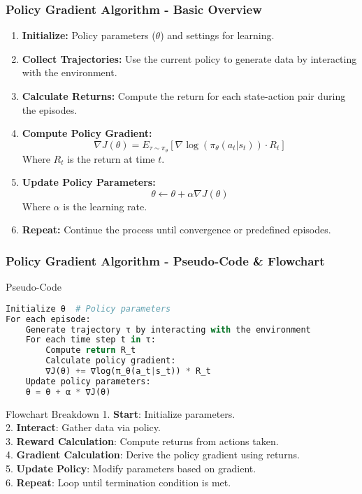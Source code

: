 \documentclass[aspectratio=169]{beamer}
\begin{document}
\begin{frame}[fragile]
    \frametitle{Policy Gradient Algorithm - Basic Overview}
    \begin{enumerate}
        \item \textbf{Initialize:} Policy parameters ($\theta$) and settings for learning.
        \item \textbf{Collect Trajectories:} Use the current policy to generate data by interacting with the environment.
        \item \textbf{Calculate Returns:} Compute the return for each state-action pair during the episodes.
        \item \textbf{Compute Policy Gradient:} 
        \begin{equation}
            \nabla J(\theta) = E_{\tau \sim \pi_{\theta}} \left[ \nabla \log(\pi_{\theta}(a_t|s_t)) \cdot R_t \right]
        \end{equation}
        Where $R_t$ is the return at time $t$.
        \item \textbf{Update Policy Parameters:} 
        \begin{equation}
            \theta \leftarrow \theta + \alpha \nabla J(\theta)
        \end{equation}
        Where $\alpha$ is the learning rate.
        \item \textbf{Repeat:} Continue the process until convergence or predefined episodes.
    \end{enumerate}
\end{frame}

\begin{frame}[fragile]
    \frametitle{Policy Gradient Algorithm - Pseudo-Code \& Flowchart}
    
    \begin{block}{Pseudo-Code}
        \begin{lstlisting}[language=Python]
Initialize θ  # Policy parameters
For each episode:
    Generate trajectory τ by interacting with the environment
    For each time step t in τ:
        Compute return R_t
        Calculate policy gradient:
        ∇J(θ) += ∇log(π_θ(a_t|s_t)) * R_t
    Update policy parameters:
    θ = θ + α * ∇J(θ)
        \end{lstlisting}
    \end{block}

    \begin{block}{Flowchart Breakdown}
        1. \textbf{Start}: Initialize parameters.\\
        2. \textbf{Interact}: Gather data via policy.\\
        3. \textbf{Reward Calculation}: Compute returns from actions taken.\\
        4. \textbf{Gradient Calculation}: Derive the policy gradient using returns.\\
        5. \textbf{Update Policy}: Modify parameters based on gradient.\\
        6. \textbf{Repeat}: Loop until termination condition is met.
    \end{block}
\end{frame}
\end{document}
